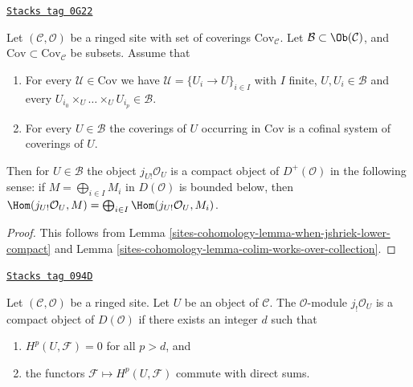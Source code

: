 \begin{lemma}
\label{sites-cohomology-lemma-when-jshriek-lower-compact-worked-out}
\href{https://stacks.math.columbia.edu/tag/0G22}{\texttt{Stacks tag 0G22}}

Let $(\mathcal{C}, \mathcal{O})$ be a ringed site
with set of coverings $\text{Cov}_\mathcal{C}$.
Let $\mathcal{B} \subset \Ob(\mathcal{C})$, and
$\text{Cov} \subset \text{Cov}_\mathcal{C}$
be subsets. Assume that
\begin{enumerate}
\item For every $\mathcal{U} \in \text{Cov}$ we have
$\mathcal{U} = \{U_i \to U\}_{i \in I}$ with $I$ finite,
$U, U_i \in \mathcal{B}$ and every
$U_{i_0} \times_U \ldots \times_U U_{i_p} \in \mathcal{B}$.
\item For every $U \in \mathcal{B}$ the coverings of $U$
occurring in $\text{Cov}$ is a cofinal system of coverings of $U$.
\end{enumerate}
Then for $U \in \mathcal{B}$ the object $j_{U!}\mathcal{O}_U$ is
a compact object of $D^+(\mathcal{O})$ in the following sense:
if $M = \bigoplus_{i \in I} M_i$ in $D(\mathcal{O})$ is
bounded below, then $\Hom(j_{U!}\mathcal{O}_U, M) =
\bigoplus_{i \in I} \Hom(j_{U!}\mathcal{O}_U, M_i)$.
\end{lemma}

\begin{proof}
This follows from Lemma \ref{sites-cohomology-lemma-when-jshriek-lower-compact}
and Lemma \ref{sites-cohomology-lemma-colim-works-over-collection}.
\end{proof}

\begin{lemma}
\label{sites-cohomology-lemma-when-jshriek-compact}
\href{https://stacks.math.columbia.edu/tag/094D}{\texttt{Stacks tag 094D}}

Let $(\mathcal{C}, \mathcal{O})$ be a ringed site. Let $U$ be an object of
$\mathcal{C}$. The $\mathcal{O}$-module $j_!\mathcal{O}_U$ is a
compact object of $D(\mathcal{O})$ if there exists an integer $d$ such that
\begin{enumerate}
\item $H^p(U, \mathcal{F}) = 0$ for all $p > d$, and
\item the functors $\mathcal{F} \mapsto H^p(U, \mathcal{F})$
commute with direct sums.
\end{enumerate}
\end{lemma}

